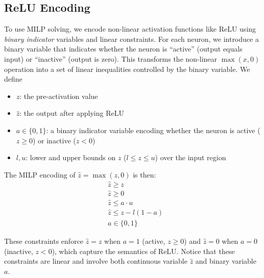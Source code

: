 \documentclass[oneside,11pt,dvipsnames]{book}
\numberwithin{equation}{section}
\theoremstyle{definition}
\theoremstyle{remark}
\begin{document}


\subsection{ReLU Encoding} 

To use MILP solving, we encode non-linear activation functions like ReLU using \emph{binary indicator} variables and linear constraints. For each neuron, we introduce a binary variable that indicates whether the neuron is ``active'' (output equals input) or ``inactive'' (output is zero). This transforms the non-linear $\max(x,0)$ operation into a set of linear inequalities controlled by the binary variable. 
We define 

\begin{itemize}
    \item $z$: the pre-activation value    
    \item $\hat{z}$: the output after applying ReLU
    \item $a \in \{0,1\}$: a binary indicator variable encoding whether the neuron is active ($z \geq 0$) or inactive ($z < 0$)
    \item $l, u$: lower and upper bounds on $z$ ($l \leq z \leq u$) over the input region 
\end{itemize}

The MILP encoding of $\hat{z} = \max(z, 0)$ is then:
\begin{align*}
    &\hat{z} \geq z \\
    &\hat{z} \geq 0 \\
    &\hat{z} \leq a \cdot u \\
    &\hat{z} \leq z - l(1-a) \\
    &a \in \{0,1\}
\end{align*}

These constraints enforce $\hat{z} = z$ when $a = 1$ (active, $z \geq 0$) and $\hat{z} = 0$ when $a = 0$ (inactive, $z < 0$), which capture the semantics of ReLU. Notice that these constraints are linear and involve both continuous variable $\hat{z}$ and binary variable $a$.
\end{document}
